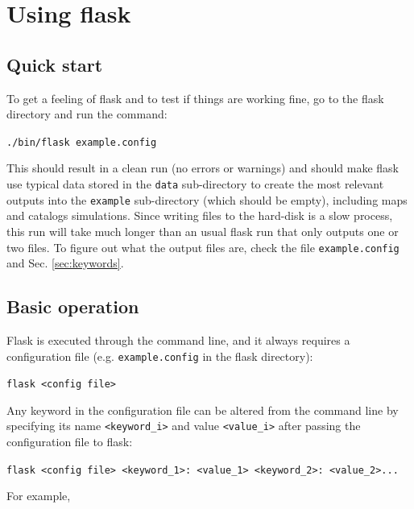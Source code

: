 \documentclass[12pt]{book} %
\begin{document}
\section{Using {\sc flask}}
\label{sec:flask}

\subsection{Quick start}
\label{sec:quick-start}

To get a feeling of {\sc flask} and to test if things are working fine, go to the {\sc flask} 
directory and run the command:

\vspace{0.5cm}
\noindent
{\tt ./bin/flask example.config}
\vspace{0.5cm}

\noindent
This should result in a clean run (no errors or warnings) and should make {\sc flask} 
use typical data stored in the {\tt data} sub-directory to create 
the most relevant outputs into the {\tt example} sub-directory (which should be empty), 
including maps and catalogs simulations. Since writing files to the hard-disk is a slow process, 
this run will take much longer than an usual {\sc flask} run that only outputs one or two files. 
To figure out what the output files are, check the file {\tt example.config} and Sec. 
\ref{sec:keywords}.
 
\subsection{Basic operation}
\label{sec:operation}

{\sc Flask} is executed through the command line, and it always requires a configuration file 
(e.g. {\tt example.config} in the {\sc flask} directory):

\vspace{0.5cm}
\noindent
{\tt flask <config file>}
\vspace{0.5cm}

Any keyword in the configuration file can be altered from the command line by specifying its 
name {\tt<keyword\_i>} and value {\tt<value\_i>} after passing the configuration file to {\sc flask}: 

\vspace{0.5cm}
\noindent
{\tt flask <config file> <keyword\_1>: <value\_1> <keyword\_2>: <value\_2>...}
\vspace{0.5cm}

\noindent
For example,
\end{document}
